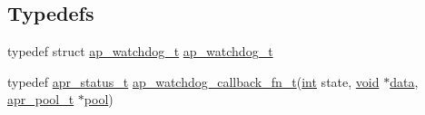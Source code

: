 \subsection*{Typedefs}
\begin{DoxyCompactItemize}
\item 
typedef struct \hyperlink{structap__watchdog__t}{ap\+\_\+watchdog\+\_\+t} \hyperlink{group__MOD__WATCHDOG_ga2b27df208e4b7302db3371ab7a3a5a6b}{ap\+\_\+watchdog\+\_\+t}
\item 
typedef \hyperlink{group__apr__errno_gaa5105fa83cc322f09382292db8b47593}{apr\+\_\+status\+\_\+t} \hyperlink{group__MOD__WATCHDOG_gaf35a15ca6cadfcd5df128e79cb51c115}{ap\+\_\+watchdog\+\_\+callback\+\_\+fn\+\_\+t}(\hyperlink{pcre_8txt_a42dfa4ff673c82d8efe7144098fbc198}{int} state, \hyperlink{group__MOD__ISAPI_gacd6cdbf73df3d9eed42fa493d9b621a6}{void} $\ast$\hyperlink{structdata}{data}, \hyperlink{structapr__pool__t}{apr\+\_\+pool\+\_\+t} $\ast$\hyperlink{group__APR__XLATE_gabb3cd978f04c73d0b763c391e9bfde73}{pool})
\end{DoxyCompactItemize}
